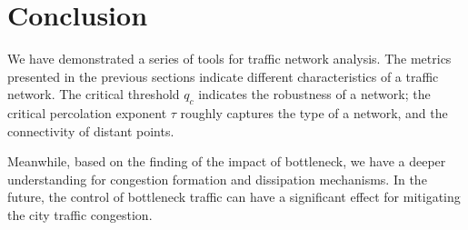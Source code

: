 \section{Conclusion}
We have demonstrated a series of tools for traffic network analysis. The metrics presented in the previous sections indicate different characteristics of a traffic network. The critical threshold $q_c$ indicates the robustness of a network; the critical percolation exponent $\tau$ roughly captures the type of a network, and the connectivity of distant points.

Meanwhile, based on the finding of the impact of bottleneck, we have a deeper understanding for congestion formation and dissipation mechanisms. In the future, the control of bottleneck traffic can have a significant effect for mitigating the city traffic congestion.